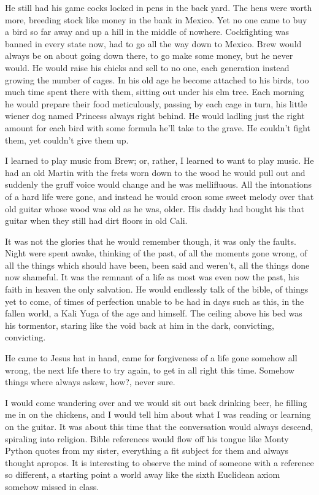 \documentclass[ebook, 10pt, openright, onecolumn]{memoir}
\newcommand*\td[1]{
  \todo[inline]{
     #1 
  }
}
\newcommand*\finish{\td{ ----- Finish this section -----}}
\begin{document}
He still had his game cocks locked in pens in the back yard.  The hens
were worth more, breeding stock like money in the bank in Mexico.  Yet no one
came to buy a bird so far away and up a hill in the middle of
nowhere. Cockfighting was banned in every state now, had to go all the way down
to Mexico.  Brew would always be on about going down there, to go make some
money, but he never would.  He would raise his chicks and sell to no one, each
generation instead growing the number of cages.  In his old age he become
attached to his birds, too much time spent there with them, sitting out under
his elm tree.  Each morning he would prepare their food meticulously, passing by
each cage in turn, his little wiener dog named Princess always right behind. He
would ladling just the right amount for each bird with some formula he'll take
to the grave.  He couldn't fight them, yet couldn't give them up.

I learned to play music from Brew; or, rather, I learned to want to play music.
He had an old Martin with the frets worn down to the wood he would pull out and
suddenly the gruff voice would change and he was mellifluous.  All the
intonations of a hard life were gone, and instead he would croon some sweet
melody over that old guitar whose wood was old as he was, older.  His daddy had
bought his that guitar when they still had dirt floors in old Cali.

It was not the glories that he would remember though, it was only the faults.
Night were spent awake, thinking of the past, of all the moments gone wrong, of
all the things which should have been, been said and weren't, all the things
done now shameful.  It was the remnant of a life as most was even now the past,
his faith in heaven the only salvation.  He would endlessly talk of the bible,
of things yet to come, of times of perfection unable to be had in days such as
this, in the fallen world, a Kali Yuga of the age and himself.  The ceiling
above his bed was his tormentor, staring like the void back at him in the dark,
convicting, convicting.

He came to Jesus hat in hand, came for forgiveness of a life gone somehow all
wrong, the next life there to try again, to get in all right this time.  Somehow
things where always askew, how?, never sure.
\finish

I would come wandering over and we would sit out back drinking beer, he filling
me in on the chickens, and I would tell him about what I was reading or learning
on the guitar.  It was about this time that the conversation would always
descend, spiraling into religion.  Bible references would flow off his tongue
like Monty Python quotes from my sister, everything a fit subject for them and
always thought apropos.  It is interesting to observe the mind of someone with a
reference so different, a starting point a world away like the sixth Euclidean
axiom somehow missed in class.
\end{document}
